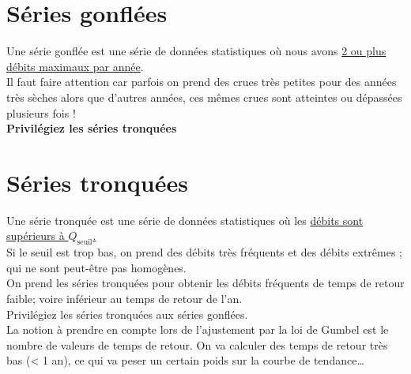\section{Séries gonflées}
Une série gonflée est une série de données statistiques où nous avons \underline{2 ou plus débits maximaux par année}. \\
Il faut faire attention car parfois on prend des crues très petites pour des années très sèches alors que d'autres années, ces mêmes crues sont atteintes ou dépassées plusieurs fois ! \\
\textbf{Privilégiez les séries tronquées}

\section{Séries tronquées}
Une série tronquée est une série de données statistiques où les \underline{débits sont supérieurs à $Q_\text{seuil}$.} \\
\Warning Si le seuil est trop bas, on prend des débits très fréquents et des débits extrêmes ; qui ne sont peut-être pas homogènes. \\
On prend les séries tronquées pour obtenir les débits fréquents de temps de retour faible; voire inférieur au temps de retour de l'an. \\
Privilégiez les séries tronquées aux séries gonflées. \\
\Warning La notion à prendre en compte lors de l'ajustement par la loi de Gumbel est le nombre de valeurs de temps de retour.
On va calculer des temps de retour très bas (< 1 an), ce qui va peser un certain poids sur la courbe de tendance\dots